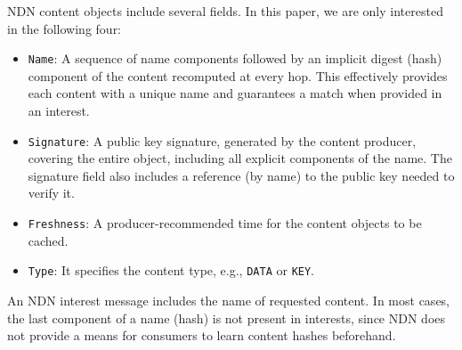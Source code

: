 \documentclass[conference]{IEEEtran}
\begin{document}
NDN content objects include several fields. In this paper, we are only interested in the following 
four:
\begin{itemize}
\item \texttt{Name}: A sequence of name components followed by an implicit digest 
(hash) component of the content recomputed at every hop. This effectively provides each content 
with a unique name and guarantees a match when provided in an interest.
\item \texttt{Signature}: A public key signature, generated by the content producer, covering 
the entire object, including all explicit components of the name. The signature field also includes 
a reference (by name) to the public key needed to verify it.
\item \texttt{Freshness}: A producer-recommended time for the content objects to be cached.
\item \texttt{Type}: It specifies the content type, e.g., \texttt{DATA} or \texttt{KEY}.
\end{itemize}
An NDN interest message includes the name of requested content. In 
most cases, the last  component of a name (hash) is not present in interests, 
since NDN does not provide a means for consumers to learn content hashes
beforehand.
\end{document}
